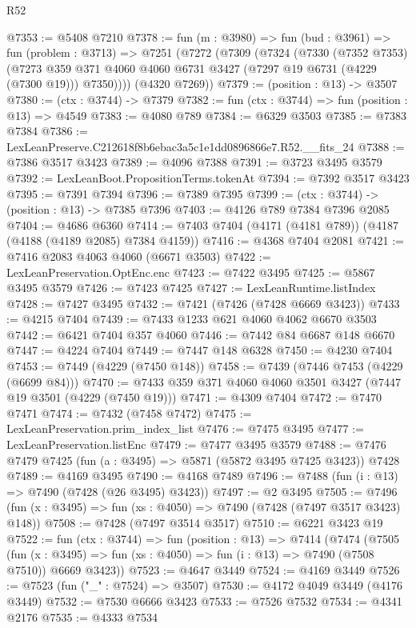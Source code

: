 \begin{lexlean}{R52}
\begin{coremodule}
@7353 := @5408 @7210
@7378 := fun (m : @3980) =>
  fun (bud : @3961) =>
  fun (problem : @3713) =>
  @7251
    (@7272
      (@7309
        (@7324
          (@7330
            (@7352 @7353)
            (@7273 @359 @371 @4060 @4060 @6731 @3427 (@7297 @19 @6731 (@4229 (@7300 @19))) @7350))))
      (@4320 @7269))
@7379 := (position : @13) -> @3507
@7380 := (ctx : @3744) -> @7379
@7382 := fun (ctx : @3744) => fun (position : @13) => @4549
@7383 := @4080 @789
@7384 := @6329 @3503
@7385 := @7383 @7384
@7386 := LexLeanPreserve.C212618f8b6ebac3a5c1e1dd0896866e7.R52.__fits_24
@7388 := @7386 @3517 @3423
@7389 := @4096 @7388
@7391 := @3723 @3495 @3579
@7392 := LexLeanBoot.PropositionTerms.tokenAt
@7394 := @7392 @3517 @3423
@7395 := @7391 @7394
@7396 := @7389 @7395
@7399 := (ctx : @3744) -> (position : @13) -> @7385 @7396
@7403 := @4126 @789 @7384 @7396 @2085
@7404 := @4686 @6360
@7414 := @7403 @7404 (@4171 (@4181 @789)) (@4187 (@4188 (@4189 @2085) @7384 @4159))
@7416 := @4368 @7404 @2081
@7421 := @7416 @2083 @4063 @4060 (@6671 @3503)
@7422 := LexLeanPreservation.OptEnc.enc
@7423 := @7422 @3495
@7425 := @5867 @3495 @3579
@7426 := @7423 @7425
@7427 := LexLeanRuntime.listIndex
@7428 := @7427 @3495
@7432 := @7421 (@7426 (@7428 @6669 @3423))
@7433 := @4215 @7404
@7439 := @7433 @1233 @621 @4060 @4062 @6670 @3503
@7442 := @6421 @7404 @357 @4060
@7446 := @7442 @84 @6687 @148 @6670
@7447 := @4224 @7404
@7449 := @7447 @148 @6328
@7450 := @4230 @7404
@7453 := @7449 (@4229 (@7450 @148))
@7458 := @7439 (@7446 @7453 (@4229 (@6699 @84)))
@7470 := @7433 @359 @371 @4060 @4060 @3501 @3427 (@7447 @19 @3501 (@4229 (@7450 @19)))
@7471 := @4309 @7404
@7472 := @7470 @7471
@7474 := @7432 (@7458 @7472)
@7475 := LexLeanPreservation.prim_index_list
@7476 := @7475 @3495
@7477 := LexLeanPreservation.listEnc
@7479 := @7477 @3495 @3579
@7488 := @7476 @7479 @7425 (fun (a : @3495) => @5871 (@5872 @3495 @7425 @3423)) @7428
@7489 := @4169 @3495
@7490 := @4168 @7489
@7496 := @7488 (fun (i : @13) => @7490 (@7428 (@26 @3495) @3423))
@7497 := @2 @3495
@7505 := @7496 (fun (x : @3495) => fun (xs : @4050) => @7490 (@7428 (@7497 @3517 @3423) @148))
@7508 := @7428 (@7497 @3514 @3517)
@7510 := @6221 @3423 @19
@7522 := fun (ctx : @3744) =>
  fun (position : @13) =>
  @7414
    (@7474
      (@7505
        (fun (x : @3495) => fun (xs : @4050) => fun (i : @13) => @7490 (@7508 @7510))
        @6669
        @3423))
@7523 := @4647 @3449
@7524 := @4169 @3449
@7526 := @7523 (fun ("_" : @7524) => @3507)
@7530 := @4172 @4049 @3449 (@4176 @3449)
@7532 := @7530 @6666 @3423
@7533 := @7526 @7532
@7534 := @4341 @2176
@7535 := @4333 @7534

\end{coremodule}
\end{lexlean}
